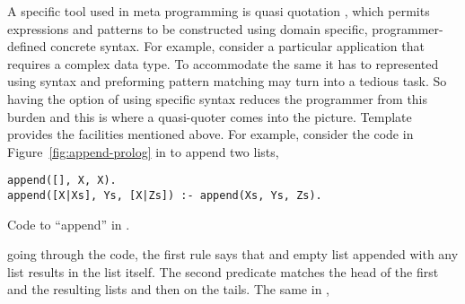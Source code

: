 \documentclass[thesis-solanki.tex]{subfiles}
\begin{document}
A specific tool used in meta programming is quasi quotation
\cite{mainland2007s,haskellquasi,wikiquasi},
which permits
 expressions and patterns to be constructed using domain specific, programmer-defined concrete
syntax.
For example, consider a particular application that requires a complex data type.
To accommodate the same it has to represented using  syntax and preforming
pattern matching may
turn into a tedious task.
So having the option of using specific syntax reduces the programmer from this burden and this is where a
quasi-quoter comes into the picture.
Template  provides the facilities mentioned above.
For example, consider the code in Figure~\ref{fig:append-prolog}
in  to append two lists,
\begin{code-list}[h]
\begin{verbatim}
append([], X, X).
append([X|Xs], Ys, [X|Zs]) :- append(Xs, Ys, Zs).
\end{verbatim}    
\vspace*{-0.8\baselineskip}
\caption{Code to ``append'' in \protect{}.}
\label{fig:append-prolog}
\end{code-list}
going through the code, the first rule says that and empty list appended with any list results in the list itself.
The second predicate matches the head of the first and the resulting
lists and then  on the tails. 
The same in ,
\inputminted[linenos]{haskell}{append.pl}
\end{document}
